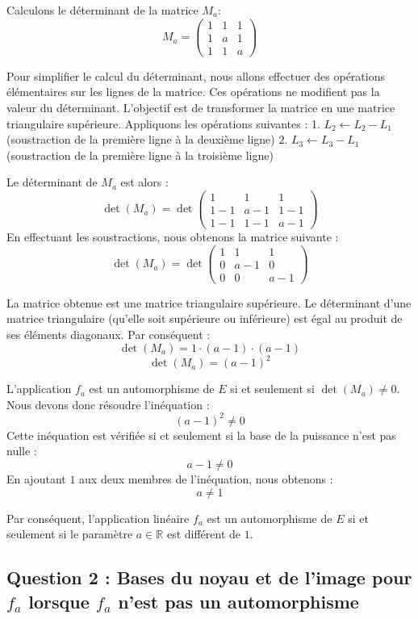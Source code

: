\documentclass{report}
\begin{document}
Calculons le déterminant de la matrice $M_a$:
$$M_a = \begin{pmatrix} 1 & 1 & 1 \\ 1 & a & 1 \\ 1 & 1 & a \end{pmatrix}$$

Pour simplifier le calcul du déterminant, nous allons effectuer des opérations élémentaires sur les lignes de la matrice. Ces opérations ne modifient pas la valeur du déterminant. L'objectif est de transformer la matrice en une matrice triangulaire supérieure.
Appliquons les opérations suivantes :
1.  $L_2 \leftarrow L_2 - L_1$ (soustraction de la première ligne à la deuxième ligne)
2.  $L_3 \leftarrow L_3 - L_1$ (soustraction de la première ligne à la troisième ligne)

Le déterminant de $M_a$ est alors :
$$ \det(M_a) = \det \begin{pmatrix} 1 & 1 & 1 \\ 1-1 & a-1 & 1-1 \\ 1-1 & 1-1 & a-1 \end{pmatrix} $$
En effectuant les soustractions, nous obtenons la matrice suivante :
$$ \det(M_a) = \det \begin{pmatrix} 1 & 1 & 1 \\ 0 & a-1 & 0 \\ 0 & 0 & a-1 \end{pmatrix} $$

La matrice obtenue est une matrice triangulaire supérieure. Le déterminant d'une matrice triangulaire (qu'elle soit supérieure ou inférieure) est égal au produit de ses éléments diagonaux.
Par conséquent :
$$ \det(M_a) = 1 \cdot (a-1) \cdot (a-1) $$
$$ \det(M_a) = (a-1)^2 $$

L'application $f_a$ est un automorphisme de $E$ si et seulement si $\det(M_a) \neq 0$.
Nous devons donc résoudre l'inéquation :
$$ (a-1)^2 \neq 0 $$
Cette inéquation est vérifiée si et seulement si la base de la puissance n'est pas nulle :
$$ a-1 \neq 0 $$
En ajoutant $1$ aux deux membres de l'inéquation, nous obtenons :
$$ a \neq 1 $$

Par conséquent, l'application linéaire $f_a$ est un automorphisme de $E$ si et seulement si le paramètre $a \in \mathbb{R}$ est différent de $1$.

\subsection*{Question 2 : Bases du noyau et de l'image pour $f_a$ lorsque $f_a$ n'est pas un automorphisme}
\end{document}
